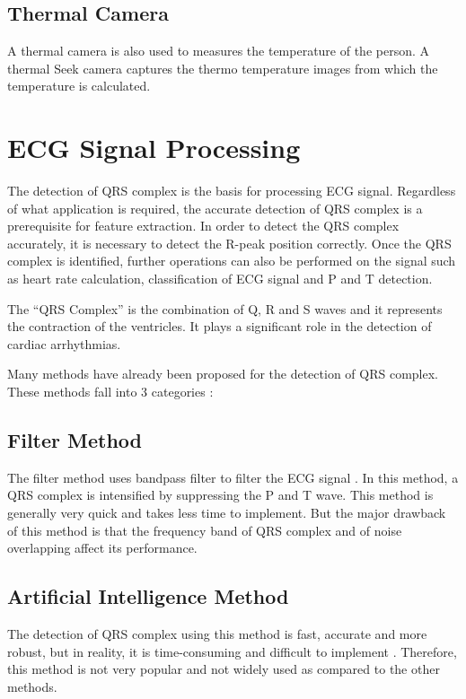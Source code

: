 \subsection{Thermal Camera}
A thermal camera is also used to measures the temperature of the person. A thermal Seek camera captures the thermo temperature images from which the temperature is calculated.

\section{ECG Signal Processing}
The detection of QRS complex is the basis for processing ECG signal. Regardless of what application is required, the accurate detection of QRS complex is a prerequisite for feature extraction. In order to detect the QRS complex accurately, it is necessary to detect the R-peak position correctly. Once the QRS complex is identified, further operations can also be performed on the signal such as heart rate calculation, classification of ECG signal and P and T detection.

The ``QRS Complex'' is the combination of Q, R and S waves and it represents the contraction of the ventricles. It plays a significant role in the detection of cardiac arrhythmias.

Many methods have already been proposed for the detection of QRS complex. These methods fall into 3 categories \cite{5639905}:

\subsection{Filter Method}
The filter method uses bandpass filter to filter the ECG signal \cite{4122029}\cite{554762}. In this method, a QRS complex is intensified by suppressing the P and T wave. This method is generally very quick and takes less time to implement. But the major drawback of this method is that the frequency band of QRS complex and of noise overlapping affect its performance.

\subsection{Artificial Intelligence Method}
The detection of QRS complex using this method is fast, accurate and more robust, but in reality, it is time-consuming and difficult to implement \cite{126604}\cite{PIETKA1991139}\cite{58593}. Therefore, this method is not very popular and not widely used as compared to the other methods.

